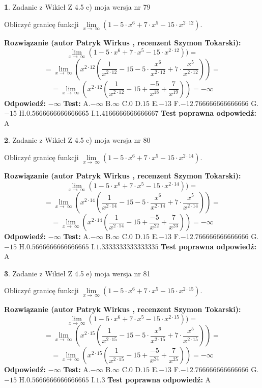 \documentclass[12pt, a4paper]{article}
\theoremstyle{definition} %
\newtheorem{zad}{}
\newcommand{\zadStart}[1]{\begin{zad}#1\newline}
\newcommand{\zadStop}{\end{zad}}
\newcommand{\rozwStart}[2]{\noindent \textbf{Rozwiązanie (autor #1 , recenzent #2): }\newline}
\newcommand{\rozwStop}{\newline}
\newcommand{\odpStart}{\noindent \textbf{Odpowiedź:}\newline}
\newcommand{\odpStop}{\newline}
\newcommand{\testStart}{\noindent \textbf{Test:}\newline}
\newcommand{\testStop}{\newline}
\newcommand{\kluczStart}{\noindent \textbf{Test poprawna odpowiedź:}\newline}
\newcommand{\kluczStop}{\newline}
\begin{document}
\zadStart{Zadanie z Wikieł Z 4.5 e) moja wersja nr 79}


Obliczyć granicę funkcji  $\lim\limits_{x\to\ \infty}(1 - 5 \cdot x^{6}+7 \cdot x^{5}- 15 \cdot x^{2\cdot12})$.
\zadStop
\rozwStart{Patryk Wirkus}{Szymon Tokarski}
$$\lim\limits_{x\to\ \infty}(1 - 5 \cdot x^{6}+7 \cdot x^{5}- 15 \cdot x^{2\cdot12}))=$$
$$=\lim\limits_{x\to\ \infty}(x^{2\cdot12}(\frac{1}{x^{2\cdot12}}-15 -5 \cdot \frac{x^{6}}{x^{2\cdot12}}+7 \cdot \frac{x^{5}}{x^{2\cdot12}}))=$$
$$=\lim\limits_{x\to\ \infty}(x^{2\cdot12}(\frac{1}{x^{2\cdot12}}-15 + \frac{-5}{x^{18}}+ \frac{7}{x^{19}}))=-\infty$$
\rozwStop
\odpStart
$-\infty$
\odpStop
\testStart
A.$-\infty$ B.$\infty$ C.$0$ D.$15$ E.$-13$
F.$-12.766666666666666$ G.$-15$
H.$0.5666666666666665$
I.$1.4166666666666667$
\testStop
\kluczStart
A
\kluczStop



\zadStart{Zadanie z Wikieł Z 4.5 e) moja wersja nr 80}


Obliczyć granicę funkcji  $\lim\limits_{x\to\ \infty}(1 - 5 \cdot x^{6}+7 \cdot x^{5}- 15 \cdot x^{2\cdot14})$.
\zadStop
\rozwStart{Patryk Wirkus}{Szymon Tokarski}
$$\lim\limits_{x\to\ \infty}(1 - 5 \cdot x^{6}+7 \cdot x^{5}- 15 \cdot x^{2\cdot14}))=$$
$$=\lim\limits_{x\to\ \infty}(x^{2\cdot14}(\frac{1}{x^{2\cdot14}}-15 -5 \cdot \frac{x^{6}}{x^{2\cdot14}}+7 \cdot \frac{x^{5}}{x^{2\cdot14}}))=$$
$$=\lim\limits_{x\to\ \infty}(x^{2\cdot14}(\frac{1}{x^{2\cdot14}}-15 + \frac{-5}{x^{22}}+ \frac{7}{x^{23}}))=-\infty$$
\rozwStop
\odpStart
$-\infty$
\odpStop
\testStart
A.$-\infty$ B.$\infty$ C.$0$ D.$15$ E.$-13$
F.$-12.766666666666666$ G.$-15$
H.$0.5666666666666665$
I.$1.3333333333333335$
\testStop
\kluczStart
A
\kluczStop



\zadStart{Zadanie z Wikieł Z 4.5 e) moja wersja nr 81}


Obliczyć granicę funkcji  $\lim\limits_{x\to\ \infty}(1 - 5 \cdot x^{6}+7 \cdot x^{5}- 15 \cdot x^{2\cdot15})$.
\zadStop
\rozwStart{Patryk Wirkus}{Szymon Tokarski}
$$\lim\limits_{x\to\ \infty}(1 - 5 \cdot x^{6}+7 \cdot x^{5}- 15 \cdot x^{2\cdot15}))=$$
$$=\lim\limits_{x\to\ \infty}(x^{2\cdot15}(\frac{1}{x^{2\cdot15}}-15 -5 \cdot \frac{x^{6}}{x^{2\cdot15}}+7 \cdot \frac{x^{5}}{x^{2\cdot15}}))=$$
$$=\lim\limits_{x\to\ \infty}(x^{2\cdot15}(\frac{1}{x^{2\cdot15}}-15 + \frac{-5}{x^{24}}+ \frac{7}{x^{25}}))=-\infty$$
\rozwStop
\odpStart
$-\infty$
\odpStop
\testStart
A.$-\infty$ B.$\infty$ C.$0$ D.$15$ E.$-13$
F.$-12.766666666666666$ G.$-15$
H.$0.5666666666666665$
I.$1.3$
\testStop
\kluczStart
A
\kluczStop
\end{document}
